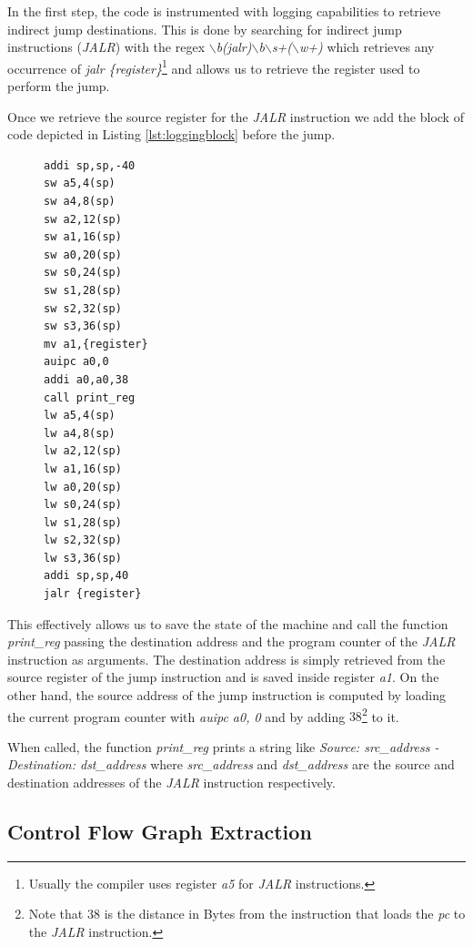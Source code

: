 In the first step, the code is instrumented with logging capabilities to retrieve
indirect jump destinations. This is done by searching for indirect jump
instructions (\textit{JALR}) with the regex \textit{$\backslash$b(jalr)$\backslash$b$\backslash$s+($\backslash$w+)}
which retrieves any occurrence of \textit{jalr \{register\}}\footnote{Usually
the compiler uses register \textit{a5} for \textit{JALR} instructions.} and
allows us to retrieve the register used to perform the jump.

Once we retrieve the source register for the \textit{JALR} instruction we add the
block of code depicted in Listing \ref{lst:loggingblock} before the jump.

\begin{figure}
  \setlength{\intextsep}{0pt}
  \begin{minipage}{0.25\textwidth}
    \begin{lstlisting}[style=Assembly, caption = Logging code block, label={lst:loggingblock}]
addi sp,sp,-40
sw a5,4(sp)
sw a4,8(sp)
sw a2,12(sp)
sw a1,16(sp)
sw a0,20(sp)
sw s0,24(sp)
sw s1,28(sp)
sw s2,32(sp)
sw s3,36(sp)
mv a1,{register}
auipc a0,0
addi a0,a0,38
call print_reg
lw a5,4(sp)
lw a4,8(sp)
lw a2,12(sp)
lw a1,16(sp)
lw a0,20(sp)
lw s0,24(sp)
lw s1,28(sp)
lw s2,32(sp)
lw s3,36(sp)
addi sp,sp,40
jalr {register}
 \end{lstlisting}
  \end{minipage}
\end{figure}

This effectively allows us to save the state of the machine and call the
function \textit{print\_reg} passing the destination address and the program counter
of the \textit{JALR} instruction as arguments. The destination address is simply
retrieved from the source register of the jump instruction and is saved inside register
\textit{a1}. On the other hand, the source address of the jump instruction is
computed by loading the current program counter with \textit{auipc a0, 0} and by
adding $38$\footnote{Note that $38$ is the distance in Bytes from the
instruction that loads the \textit{pc} to the \textit{JALR} instruction.} to it.

When called, the function \textit{print\_reg} prints a string like \textit{Source:
src\_address - Destination: dst\_address} where \textit{src\_address} and
\textit{dst\_address} are the source and destination addresses of the \textit{JALR}
instruction respectively.

\subsection{Control Flow Graph Extraction}
\label{subsec:project_cfgextraction}

